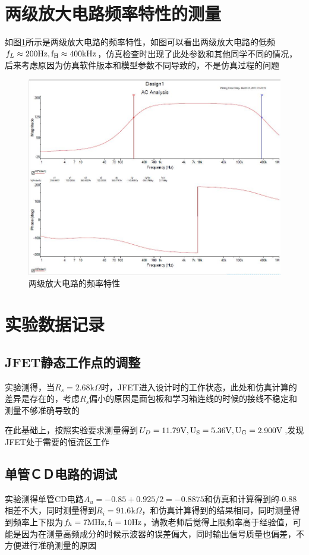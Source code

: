 \documentclass[UTF8,a4paper]{ctexart}
\begin{document}
\section{两级放大电路频率特性的测量}
如图\ref{f}所示是两级放大电路的频率特性，如图可以看出两级放大电路的低频$f_L\approx 200 \rm{Hz},f_H\approx 400\rm{kHz}$，仿真检查时出现了此处参数和其他同学不同的情况，后来考虑原因为仿真软件版本和模型参数不同导致的，不是仿真过程的问题
\begin{figure}
\centering
\includegraphics[width=\textwidth]{f.jpg}
\caption{两级放大电路的频率特性}
\label{f}
\end{figure}
\section{实验数据记录}
\subsection{JFET静态工作点的调整}
实验测得，当$R_s=2.68\mathrm{k}\Omega$时，JFET进入设计时的工作状态，此处和仿真计算的差异是存在的，考虑$R_s$偏小的原因是面包板和学习箱连线的时候的接线不稳定和测量不够准确导致的

在此基础上，按照实验要求测量得到$U_D=11.79\rm{V},U_S=5.36\rm{V},U_G=2.900\rm{V}$,发现JFET处于需要的恒流区工作
\subsection{单管ＣＤ电路的调试}
实验测得单管CD电路$A_u=-0.85+0.925/2=-0.8875$和仿真和计算得到的-0.88相差不大，同时测量得到$R_i=91.6\mathrm{k}\Omega$，和仿真计算得到的结果相同，同时测量得到频率上下限为$f_h= 7\rm{MHz},f_l=10\rm{Hz}$，请教老师后觉得上限频率高于经验值，可能是因为在测量高频成分的时候示波器的误差偏大，同时输出信号质量也偏差，不方便进行准确测量的原因
\end{document}
